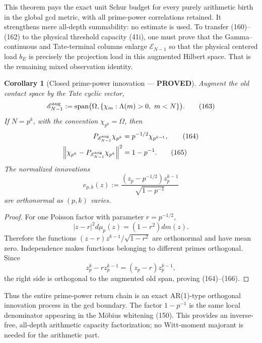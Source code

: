 \documentclass[11pt]{article}
\newtheorem{corollary}[theorem]{Corollary}
\newcommand{\PROVED}{\textcolor{green!45!black}{\textbf{PROVED}}}
\begin{document}
This theorem pays the exact unit Schur budget for every purely arithmetic
birth in the global gcd metric, with all prime-power correlations retained.
It strengthens mere all-depth summability: no estimate is used.  To transfer
(160)--(162) to the physical threshold capacity (41i), one must prove that
the Gamma--continuous and Tate-terminal columns enlarge
$\mathscr E_{N-1}$ so that the physical centered load $b_E$ is precisely the
projection load in this augmented Hilbert space.  That is the remaining
mixed observation identity.

\begin{corollary}[Closed prime-power innovation --- \PROVED]
Augment the old contact space by the Tate cyclic vector,
\begin{equation}
 \mathscr E_{N-1}^{\rm aug}
 :=\operatorname{span}\bigl(\Omega,
       \{\chi_m:\Lambda(m)>0,\ m<N\}\bigr).           \tag{163}
\end{equation}
If $N=p^k$, with the convention $\chi_{p^0}=\Omega$, then
\begin{align}
 P_{\mathscr E_{N-1}^{\rm aug}}\chi_{p^k}
 &=p^{-1/2}\chi_{p^{k-1}},                             \tag{164}\\
 \left\|\chi_{p^k}-
 P_{\mathscr E_{N-1}^{\rm aug}}\chi_{p^k}\right\|^2
 &=1-p^{-1}.                                           \tag{165}
\end{align}
The normalized innovations
\begin{equation}
 e_{p,k}(z):=\frac{(z_p-p^{-1/2})z_p^{k-1}}
                   {\sqrt{1-p^{-1}}}                  \tag{166}
\end{equation}
are orthonormal as $(p,k)$ varies.
\end{corollary}

\begin{proof}
For one Poisson factor with parameter $r=p^{-1/2}$,
\begin{equation}
 |z-r|^2d\mu_p(z)=(1-r^2)dm(z).                        \tag{167}
\end{equation}
Therefore the functions
$(z-r)z^{k-1}/\sqrt{1-r^2}$ are orthonormal and have mean zero.  Independence
makes functions belonging to different primes orthogonal.  Since
\[
 z_p^k-rz_p^{k-1}=(z_p-r)z_p^{k-1},
\]
the right side is orthogonal to the augmented old span, proving
(164)--(166).
\end{proof}

Thus the entire prime-power return chain is an exact AR(1)-type orthogonal
innovation process in the gcd boundary.  The factor $1-p^{-1}$ is the same
local denominator appearing in the M\"obius whitening (150).  This provides
an inverse-free, all-depth arithmetic capacity factorization; no Witt-moment
majorant is needed for the arithmetic part.
\end{document}
